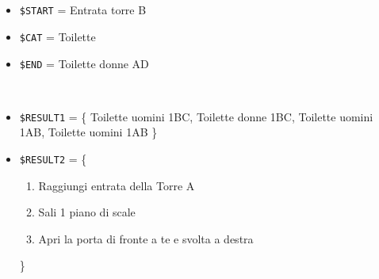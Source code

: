 \documentclass[../../Sperimentazione.tex]{subfiles}
\begin{document}
			\paragraph*{}
			\label{Prova1B.2}
			\begin{tcolorbox}[fonttitle=\bfseries, 
								adjusted title={\Large Prova 1B.2}, 
								breakable, 
								sharp corners=south,
								colback=white, 
								colframe=white!60!black]
								
				\begin{description}[leftmargin=0.7cm,labelwidth=!]
				
					\item[Input] \ \par 
        				\begin{itemize}
        					\item \verb|$START| = Entrata torre B
							\item \verb|$CAT| = Toilette
							\item \verb|$END| = Toilette donne AD
        				\end{itemize}
        				
        			\tcbline 
        				
        			\item[Output atteso] \ \par
        				\begin{itemize}

							\item \verb|$RESULT1| = \{
								Toilette uomini 1BC, Toilette donne 1BC, Toilette uomini 1AB, Toilette uomini 1AB
							\}        				
        				
        					\item \verb|$RESULT2| = \{
        					\begin{enumerate}
        						\item Raggiungi entrata della Torre A
								\item Sali 1 piano di scale
								\item Apri la porta di fronte a te e svolta a destra
        					\end{enumerate}
        					\}
        				\end{itemize}

					\tcbline        				
        				
        			\item[Output riscontrato] \ \par
        				\begin{description}
        				

\end{description}
\end{description}
\end{tcolorbox}
\end{document}
